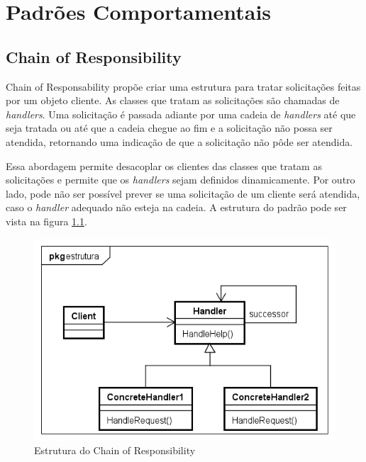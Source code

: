 \chapter{Padrões Comportamentais}

\section{Chain of Responsibility}

Chain of Responsability propõe criar uma estrutura para 
tratar solicitações feitas por um objeto cliente. As classes 
que tratam as solicitações são chamadas de \textit{handlers}. 
Uma solicitação é passada adiante por uma cadeia de 
\textit{handlers} até que seja tratada ou 
até que a cadeia chegue ao fim e a solicitação 
não possa ser atendida, retornando uma indicação 
de que a solicitação não pôde ser atendida.

Essa abordagem permite desacoplar os clientes das classes 
que tratam as solicitações e permite que os \textit{handlers} 
sejam definidos dinamicamente. Por outro lado, pode não ser 
possível prever se uma solicitação de um cliente será atendida, 
caso o \textit{handler} adequado não esteja na cadeia. A 
estrutura do padrão pode ser vista na figura \ref{chain_struct}.

\begin{figure}[htb]
	\caption{\label{chain_struct}Estrutura do Chain of Responsibility}
	\begin{center}
	    \includegraphics[scale=0.5]{5_padroes-contexto-funcional/5.3_comportamentais/5.3.01_chain-of-responsibility/chainofresponsibility_struct.png}
	\end{center}
\end{figure}

